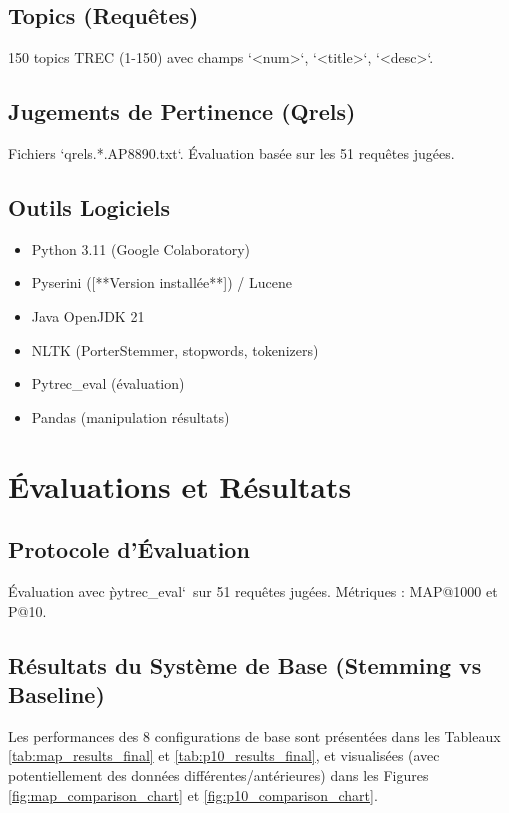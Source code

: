 \documentclass[11pt,a4paper]{article}
\begin{document}
\subsection{Topics (Requêtes)}
150 topics TREC (1-150) avec champs `<num>`, `<title>`, `<desc>`.

\subsection{Jugements de Pertinence (Qrels)}
Fichiers `qrels.*.AP8890.txt`. Évaluation basée sur les 51 requêtes jugées.

\subsection{Outils Logiciels}
\begin{itemize}
    \item Python 3.11 (Google Colaboratory)
    \item Pyserini ([**Version installée**]) / Lucene
    \item Java OpenJDK 21
    \item NLTK (PorterStemmer, stopwords, tokenizers)
    \item Pytrec\_eval (évaluation)
    \item Pandas (manipulation résultats)
\end{itemize}

\section{Évaluations et Résultats}
\label{sec:eval}
\subsection{Protocole d'Évaluation}
Évaluation avec \`pytrec_eval`\ sur 51 requêtes jugées. Métriques : MAP@1000 et P@10.

\subsection{Résultats du Système de Base (Stemming vs Baseline)}
Les performances des 8 configurations de base sont présentées dans les Tableaux \ref{tab:map_results_final} et \ref{tab:p10_results_final}, et visualisées (avec potentiellement des données différentes/antérieures) dans les Figures \ref{fig:map_comparison_chart} et \ref{fig:p10_comparison_chart}.
\end{document}
